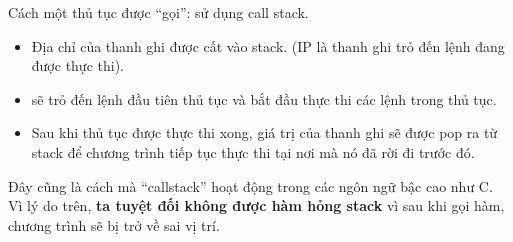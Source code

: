 \documentclass[main.tex]{subfiles}
\begin{document}
Cách một thủ tục được ``gọi'': sử dụng call stack.
\begin{itemize}
    \item Địa chỉ của thanh ghi  được cất vào stack. (IP là thanh ghi trỏ đến lệnh đang được thực thi).
    \item {} sẽ trỏ đến lệnh đầu tiên thủ tục và bắt đầu thực thi các lệnh trong thủ tục.
    \item Sau khi thủ tục được thực thi xong, giá trị của thanh ghi  sẽ được pop ra từ stack để chương trình tiếp tục thực thi tại nơi mà nó đã rời đi trước đó.
\end{itemize}
Đây cũng là cách mà ``callstack'' hoạt động trong các ngôn ngữ bậc cao như C.\\
Vì lý do trên, \textbf{ta tuyệt đối không được hàm hỏng stack} vì sau khi gọi hàm, chương trình sẽ bị trở về sai vị trí.
\end{document}
